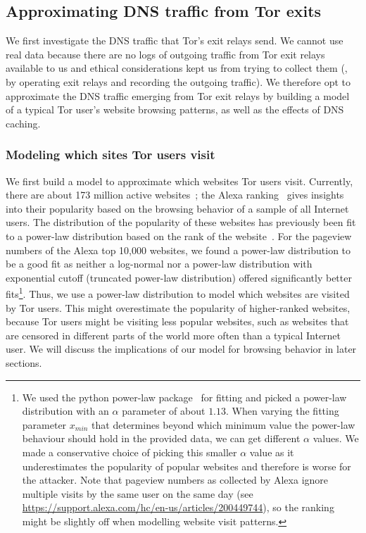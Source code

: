 \subsection{Approximating DNS traffic from Tor exits}
\label{sec:attack:sim}

We first investigate the DNS traffic that Tor's exit relays send.
We cannot use real data because there are no logs of outgoing traffic
from Tor exit relays available to us and ethical considerations kept us
from trying to collect them (\eg, by operating exit relays and recording
the outgoing traffic). We therefore opt to approximate the DNS traffic
emerging from Tor exit relays by building a model of a typical Tor
user's website browsing patterns, as well as the effects of DNS caching.

\subsubsection{Modeling which sites Tor users visit}
\label{sec:attack:pop}

We first build a model to approximate {which websites} Tor users visit.
Currently, there are about 173 million active
websites~\cite{numberofwebsites}; the Alexa ranking~\cite{alexatop1k}
gives insights into their popularity based on the browsing behavior of
a sample of all Internet users. The distribution of the popularity of
these websites has previously been fit to a power-law distribution based
on the rank of the
website~\cite{DBLP:journals/network/MahantiCMAW13,ClausetSN09,AliS07}.
For the pageview numbers of the Alexa top 10,000 websites, we found a
power-law distribution to be a good fit as neither a log-normal nor a
power-law distribution with exponential cutoff (truncated power-law
distribution) offered significantly better fits\footnote{We used the
		python power-law package~\cite{power-law}
		for fitting and picked a power-law
		distribution with an $\alpha$ parameter of about $1.13$.
		When varying the fitting parameter $x_{min}$ that determines
		beyond which minimum value the power-law behaviour should hold
		in the provided data, we can get different $\alpha$ values. We
		made a conservative choice of picking this smaller $\alpha$
		value as it underestimates the popularity of popular websites
		and therefore is worse for the attacker.
		Note that pageview numbers as collected by Alexa ignore multiple
		visits by the same user on the same day (see
		\url{https://support.alexa.com/hc/en-us/articles/200449744}), so
		the ranking might be slightly off when modelling website visit
		patterns.}.
Thus, we use a power-law distribution to model which websites are
visited by Tor users. This might overestimate the popularity of
higher-ranked websites, because Tor users might be visiting less popular
websites, such as websites that are censored in different parts of the
world more often than a typical Internet user. We will discuss the
implications of our model for browsing behavior in later sections.

